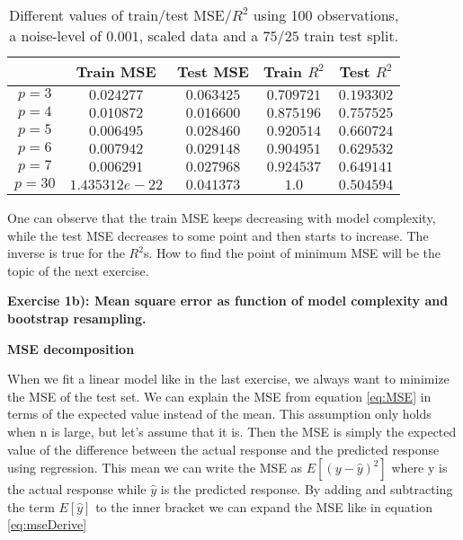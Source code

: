 \documentclass[12pt,a4paper]{article}
\begin{document}
\begin{table}[H]
\caption{\label{tab:asp} Different values of train/test MSE/$R^2$ using 100 observations, a noise-level of $0.001$, scaled data and a $75/25$ train test split.}
\centering
\begin{tabular}{c|c|c|c|c}
 & Train MSE & Test MSE & Train $R^2$ & Test $R^2$\\
\hline
$p = 3$ & $0.024277$ & $0.063425$ & $0.709721$ & $0.193302$\\
\hline
$p = 4$ & $0.010872$ & $0.016600$ & $0.875196$ & $0.757525$\\
\hline
$p = 5$ & $0.006495$ & $0.028460$ & $0.920514$ & $0.660724$\\
\hline
$p = 6$ & $0.007942$ & $0.029148$ & $0.904951$ & $0.629532$\\
\hline
$p = 7$ & $0.006291$ & $0.027968$ & $0.924537$ & $0.649141$\\
\hline
$p = 30$ & $1.435312e-22$ & $0.041373$ & $1.0$ & $0.504594$\\
\end{tabular}
\end{table}

\noindent One can observe that the train MSE keeps decreasing with model complexity, while the test MSE decreases to some point and then starts to increase. The inverse is true for the $R^2$s. How to find the point of minimum MSE will be the topic of the next exercise.


\newpage

\begin{center}
\Large{\textbf{Exercise 1b): Mean square error as function of model complexity and bootstrap resampling.}}
\end{center}

\begin{center}
\large{\textbf{MSE decomposition}}
\end{center}

\noindent When we fit a linear model like in the last exercise, we always want to minimize the MSE of the test set. We can explain the MSE from equation \ref{eq:MSE} in terms of the expected value instead of the mean. This assumption only holds when n is large, but let's assume that it is. Then the MSE is simply the expected value of the difference between the actual response and the predicted response using regression. This mean we can write the MSE as $E[(y-\hat{y})^2]$ where y is the actual response while $\hat{y}$ is the predicted response. By adding and subtracting the term $E[\hat{y}]$ to the inner bracket we can expand the MSE like in equation \ref{eq:mseDerive}
\end{document}
